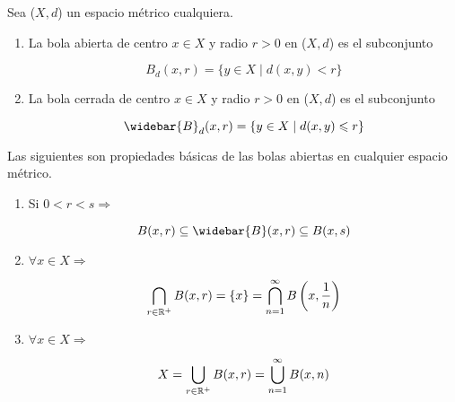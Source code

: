 \begin{definition}[Bolas]
    Sea ($X,d$) un espacio métrico cualquiera. 

    \begin{enumerate}
        \item La bola abierta de centro $x \in X$ y radio $r > 0$ en ($X,d$) es el subconjunto

        \begin{equation*}
            B_d(x,r) = \{ y \in X \mid d(x,y) < r \}
        \end{equation*}

        \item La bola cerrada de centro $x \in X$ y radio $r > 0$ en ($X,d$) es el subconjunto

        \begin{equation*}
            \widebar{B}_{d}(x,r) = \{ y \in X \mid d(x,y) \leqslant r \}
        \end{equation*}
    \end{enumerate}
\end{definition}

\begin{theorem}
    Las siguientes son propiedades básicas de las bolas abiertas en cualquier espacio métrico.

    \begin{enumerate}
        \item Si $0 < r < s \Rightarrow$

        \begin{equation*}
            B(x,r) \subseteq \widebar{B}(x,r) \subseteq B(x,s)
        \end{equation*}

        \item $\forall x \in X \Rightarrow$

        \begin{equation*}
            \bigcap_{r \in \mathbb{R}^+} B(x,r) = \{ x \} = \bigcap_{n=1}^{\infty} B \left(x, \frac{1}{n}\right)
        \end{equation*}
        
        \item $\forall x \in X \Rightarrow$

        \begin{equation*}
            X = \bigcup_{r \in \mathbb{R}^+} B(x,r)  = \bigcup_{n=1}^{\infty} B (x, n )
        \end{equation*}
    \end{enumerate}
\end{theorem}

